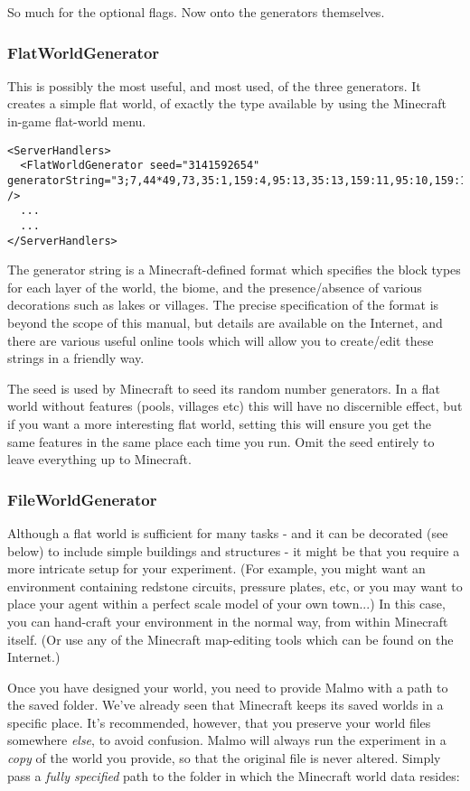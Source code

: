 \documentclass[11pt]{article} %
\begin{document}
So much for the optional flags. Now onto the generators themselves.

\subsubsection{FlatWorldGenerator}
This is possibly the most useful, and most used, of the three generators. It creates a simple flat world, of exactly the type available by using the Minecraft in-game flat-world menu.

\begin{lstlisting}[frame=lines]
<ServerHandlers>
  <FlatWorldGenerator seed="3141592654" generatorString="3;7,44*49,73,35:1,159:4,95:13,35:13,159:11,95:10,159:14,159:6,35:6,95:6;157;" />
  ...
  ...
</ServerHandlers>
\end{lstlisting}

The generator string is a Minecraft-defined format which specifies the block types for each layer of the world, the biome, and the presence/absence of various decorations such as lakes or villages. The precise specification of the format is beyond the scope of this manual, but details are available on the Internet, and there are various useful online tools which will allow you to create/edit these strings in a friendly way.

The seed is used by Minecraft to seed its random number generators. In a flat world without features (pools, villages etc) this will have no discernible effect, but if you want a more interesting flat world, setting this will ensure you get the same features in the same place each time you run. Omit the seed entirely to leave everything up to Minecraft.

\subsubsection{FileWorldGenerator}

Although a flat world is sufficient for many tasks - and it can be decorated (see below) to include simple buildings and structures - it might be that you require a more intricate setup for your experiment. (For example, you might want an environment containing redstone circuits, pressure plates, etc, or you may want to place your agent within a perfect scale model of your own town...) In this case, you can hand-craft your environment in the normal way, from within Minecraft itself. (Or use any of the Minecraft map-editing tools which can be found on the Internet.)

Once you have designed your world, you need to provide Malmo with a path to the saved folder. We've already seen that Minecraft keeps its saved worlds in a specific place. It's recommended, however, that you preserve your world files somewhere \emph{else}, to avoid confusion. Malmo will always run the experiment in a \emph{copy} of the world you provide, so that the original file is never altered. Simply pass a \emph{fully specified} path to the folder in which the Minecraft world data resides:
\end{document}
